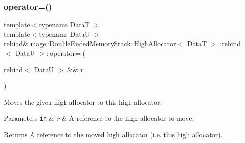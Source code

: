 \subsubsection{\texorpdfstring{operator=()}{operator=()}\hspace{0.1cm}{\footnotesize\ttfamily [2/2]}}
{\footnotesize\ttfamily template$<$typename DataT $>$ \\
template$<$typename DataU $>$ \\
\hyperlink{structmage_1_1_double_ended_memory_stack_1_1_high_allocator_1_1rebind}{rebind}\& \hyperlink{structmage_1_1_double_ended_memory_stack_1_1_high_allocator}{mage\+::\+Double\+Ended\+Memory\+Stack\+::\+High\+Allocator}$<$ DataT $>$\+::\hyperlink{structmage_1_1_double_ended_memory_stack_1_1_high_allocator_1_1rebind}{rebind}$<$ DataU $>$\+::operator= (\begin{DoxyParamCaption}\item[{\hyperlink{structmage_1_1_double_ended_memory_stack_1_1_high_allocator_1_1rebind}{rebind}$<$ DataU $>$ \&\&}]{r }\end{DoxyParamCaption})\hspace{0.3cm}{\ttfamily [delete]}}

Moves the given high allocator to this high allocator.


\begin{DoxyParams}[1]{Parameters}
\mbox{\tt in}  & {\em r} & A reference to the high allocator to move. \\
\hline
\end{DoxyParams}
\begin{DoxyReturn}{Returns}
A reference to the moved high allocator (i.\+e. this high allocator). 
\end{DoxyReturn}
